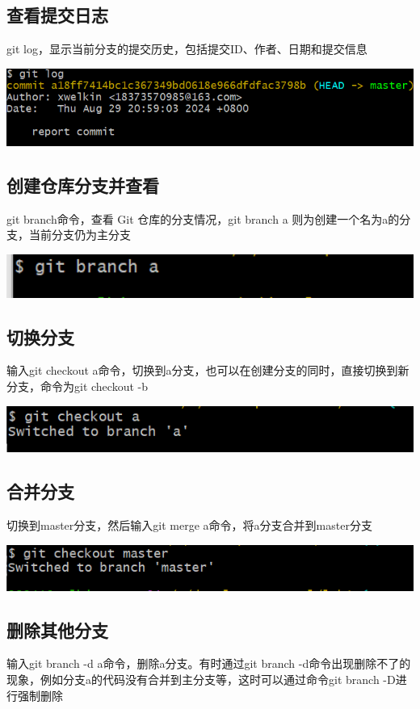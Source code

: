 \documentclass[UTF8,a4paper]{ctexart}
\begin{document}
\begin{sloppypar}
	\subsection{查看提交日志}
	git log，显示当前分支的提交历史，包括提交ID、作者、日期和提交信息
	
	\includegraphics[width = 16cm]{5}
	
	\subsection{创建仓库分支并查看}
	git branch命令，查看 Git 仓库的分支情况，git branch a 则为创建一个名为a的分支，当前分支仍为主分支
	
	\includegraphics[width = 16cm]{6}
	
	\subsection{切换分支}
	输入git checkout a命令，切换到a分支，也可以在创建分支的同时，直接切换到新分支，命令为git checkout -b
	
	\includegraphics[width = 16cm]{7}
	
	\subsection{合并分支}
	切换到master分支，然后输入git merge a命令，将a分支合并到master分支
	
	\includegraphics[width = 16cm]{8}
	
	\subsection{删除其他分支}
	输入git branch -d a命令，删除a分支。有时通过git branch -d命令出现删除不了的现象，例如分支a的代码没有合并到主分支等，这时可以通过命令git branch -D进行强制删除
	

\end{sloppypar}
\end{document}
